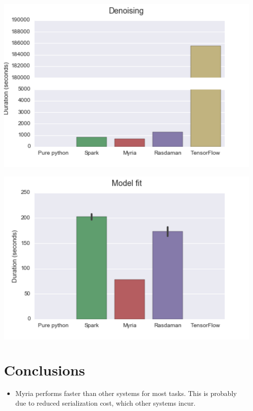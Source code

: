 \documentclass[a0,landscape]{a0poster}
\begin{document}
\begin{multicols}{3}
\begin{minipage}[b]{0.5\linewidth}
  \includegraphics[width=17cm]{Denoising.png}
\end{minipage}
\begin{minipage}[b]{0.5\linewidth}
  \includegraphics[width=17cm]{ModelFit.png}
\end{minipage}



\color{SaddleBrown} %

\section*{Conclusions}

\begin{itemize}

\item Myria performs faster than other systems for most tasks. This is probably due to reduced serialization cost, which other systems incur.


\end{itemize}
\end{multicols}
\end{document}
